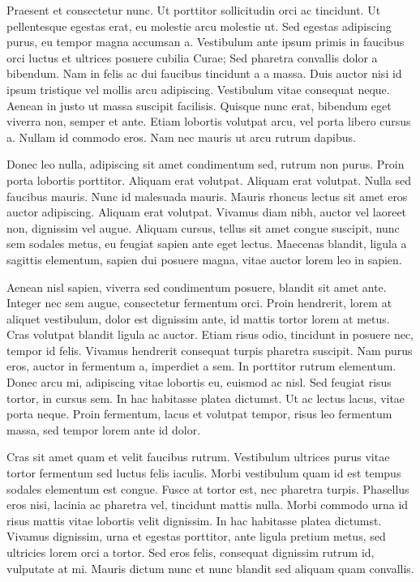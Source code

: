 \documentclass[12pt]{report}
\begin{document}
\begin{large}
Praesent et consectetur nunc. Ut porttitor sollicitudin orci ac
tincidunt. Ut pellentesque egestas erat, eu molestie arcu molestie ut.
Sed egestas adipiscing purus, eu tempor magna accumsan a. Vestibulum
ante ipsum primis in faucibus orci luctus et ultrices posuere cubilia
Curae; Sed pharetra convallis dolor a bibendum. Nam in felis ac dui
faucibus tincidunt a a massa. Duis auctor nisi id ipsum tristique vel
mollis arcu adipiscing. Vestibulum vitae consequat neque. Aenean in
justo ut massa suscipit facilisis. Quisque nunc erat, bibendum eget
viverra non, semper et ante. Etiam lobortis volutpat arcu, vel porta
libero cursus a. Nullam id commodo eros. Nam nec mauris ut arcu rutrum
dapibus.

Donec leo nulla, adipiscing sit amet condimentum sed, rutrum non
purus. Proin porta lobortis porttitor. Aliquam erat volutpat. Aliquam
erat volutpat. Nulla sed faucibus mauris. Nunc id malesuada mauris.
Mauris rhoncus lectus sit amet eros auctor adipiscing. Aliquam erat
volutpat. Vivamus diam nibh, auctor vel laoreet non, dignissim vel
augue. Aliquam cursus, tellus sit amet congue suscipit, nunc sem
sodales metus, eu feugiat sapien ante eget lectus. Maecenas blandit,
ligula a sagittis elementum, sapien dui posuere magna, vitae auctor
lorem leo in sapien.

Aenean nisl sapien, viverra sed condimentum posuere, blandit sit amet
ante. Integer nec sem augue, consectetur fermentum orci. Proin
hendrerit, lorem at aliquet vestibulum, dolor est dignissim ante, id
mattis tortor lorem at metus. Cras volutpat blandit ligula ac auctor.
Etiam risus odio, tincidunt in posuere nec, tempor id felis. Vivamus
hendrerit consequat turpis pharetra suscipit. Nam purus eros, auctor
in fermentum a, imperdiet a sem. In porttitor rutrum elementum. Donec
arcu mi, adipiscing vitae lobortis eu, euismod ac nisl. Sed feugiat
risus tortor, in cursus sem. In hac habitasse platea dictumst. Ut ac
lectus lacus, vitae porta neque. Proin fermentum, lacus et volutpat
tempor, risus leo fermentum massa, sed tempor lorem ante id dolor.

Cras sit amet quam et velit faucibus rutrum. Vestibulum ultrices purus
vitae tortor fermentum sed luctus felis iaculis. Morbi vestibulum quam
id est tempus sodales elementum est congue. Fusce at tortor est, nec
pharetra turpis. Phasellus eros nisi, lacinia ac pharetra vel,
tincidunt mattis nulla. Morbi commodo urna id risus mattis vitae
lobortis velit dignissim. In hac habitasse platea dictumst. Vivamus
dignissim, urna et egestas porttitor, ante ligula pretium metus, sed
ultricies lorem orci a tortor. Sed eros felis, consequat dignissim
rutrum id, vulputate at mi. Mauris dictum nunc et nunc blandit sed
aliquam quam convallis.


\end{large}
\end{document}

